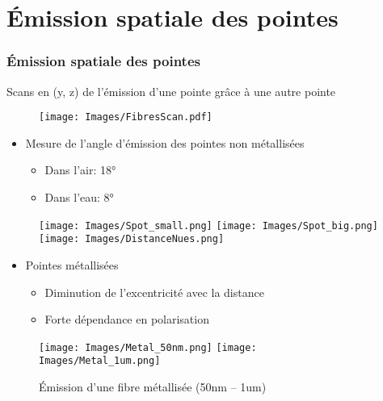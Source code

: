 \documentclass[10pt,a9paper,handout]{beamer}
\begin{document}
\section{Émission spatiale des pointes}
\begin{frame}
    \frametitle{Émission spatiale des pointes}
    Scans en (y, z) de l'émission d'une pointe grâce à une autre pointe
    \begin{figure}[c]\centering
        \texttt{[image: Images/FibresScan.pdf]}
    \end{figure}
    \begin{itemize}
        \item Mesure de l'angle d'émission des pointes non métallisées
        \begin{itemize}
            \item Dans l'air: 18\si{\degree}
            \item Dans l'eau: 8\si{\degree}
        \end{itemize}
    \end{itemize}
    \vspace*{-9mm}
    \begin{figure}[c]\centering\hspace*{40mm}
        \texttt{[image: Images/Spot\_small.png]}
        \quad
        \texttt{[image: Images/Spot\_big.png]}
        \quad
        \texttt{[image: Images/DistanceNues.png]}
    \end{figure}
    
    \begin{itemize}
        \item Pointes métallisées
        \begin{itemize}
            \item Diminution de l'excentricité avec la distance
            \item Forte dépendance en polarisation
        \end{itemize}
    \end{itemize}
    
    \begin{figure}[c]\centering
        \texttt{[image: Images/Metal\_50nm.png]}
        \quad
        \texttt{[image: Images/Metal\_1um.png]}
        \quad\vspace*{-2mm}
        \caption{Émission d'une fibre métallisée (50nm -- 1um)}
    \end{figure}

\end{frame}
\end{document}
